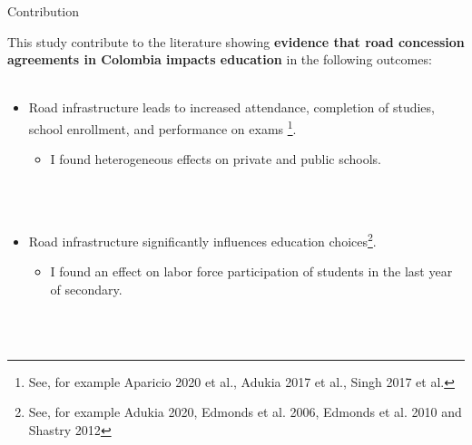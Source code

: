 \documentclass[9pt]{beamer}
\begin{document}
\begin{frame}{Contribution \hyperlink{rev.literature}{} }
     \label{contribution}
     
This study contribute to the literature showing \textbf{evidence that road concession agreements in Colombia impacts education} in the following outcomes:\\~\\

\begin{itemize}
   \item Road infrastructure leads to increased attendance, completion of studies, school enrollment, and performance on exams \footnote{\footnotesize See, for example Aparicio 2020 et al., Adukia 2017 et al.,  Singh 2017 et al.}.  
   
        \begin{itemize}
              \item I found heterogeneous effects on private and public schools.
        \end{itemize}
\\~\\
 
   \item Road infrastructure significantly influences education choices\footnote{\footnotesize See, for example  Adukia 2020,   Edmonds et al. 2006, Edmonds et al. 2010 and Shastry 2012}.     %
        \begin{itemize}
              \item I found an effect on labor force participation of students in the last year of secondary.
        \end{itemize}
 
\\~\\
 

 

 
  \end{itemize}
\end{frame}
\end{document}
